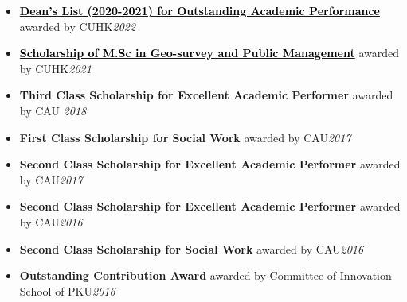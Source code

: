 \documentclass{joel_cv}
\begin{document}
\begin{itemize}
	\item \textbf{\href{https://zhu-sk.github.io/Dean's_List.pdf}{\textcolor{black}{Dean's List (2020-2021) for Outstanding Academic Performance}}}  awarded by CUHK\hfill \emph{2022}
	\item \textbf{\href{https://zhu-sk.github.io/Scholarship_of_GSPM.pdf}{\textcolor{black}{Scholarship of M.Sc in Geo-survey and Public Management}}}  awarded by CUHK\hfill \emph{2021}
	\item \textbf{Third Class Scholarship for Excellent Academic Performer} awarded by CAU \hfill \emph{2018}
	\item \textbf{First Class Scholarship for Social Work} awarded by CAU\hfill \emph{2017}
	\item \textbf{Second Class Scholarship for Excellent Academic Performer} awarded by CAU\hfill \emph{2017}
	\item \textbf{Second Class Scholarship for Excellent Academic Performer} awarded by CAU\hfill \emph{2016}
	\item \textbf{Second Class Scholarship for Social Work} awarded by CAU\hfill \emph{2016}
	\item \textbf{Outstanding Contribution Award} awarded by Committee of Innovation School of PKU\hfill \emph{2016}
\end{itemize}



%
%




%
\end{document}
